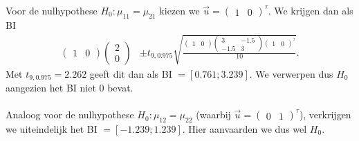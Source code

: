 \documentclass[a4paper,dutch,11pt,]{scrartcl}
\begin{document}
Voor de nulhypothese $H_0:\mu_{11}=\mu_{21}$ kiezen we $\vec{u} = \begin{pmatrix}
                                                            1 & 0
                                                           \end{pmatrix}^\tau$.
We krijgen dan als BI
\begin{align*}
\begin{pmatrix} 1 & 0 \end{pmatrix} \begin{pmatrix} 2 \\ 0 \end{pmatrix}
&\pm t_{9,0.975} \sqrt{ \frac{\begin{pmatrix} 1 & 0 \end{pmatrix} \begin{pmatrix}
                 3 & -1.5\\
		  -1.5 & 3
                \end{pmatrix}  \begin{pmatrix} 1 & 0 \end{pmatrix}^\tau}{10} }.
\end{align*} Met $t_{9,0.975} = 2.262$ geeft dit dan als BI $= [0.761; 3.239]$. We verwerpen dus $H_0$ aangezien het BI niet 0 bevat.

\paragraph{}
Analoog voor de nulhypothese $H_0:\mu_{12}=\mu_{22}$ (waarbij $\vec{u} = \begin{pmatrix}
                                                            0 & 1
                                                           \end{pmatrix}^\tau$), verkrijgen we uiteindelijk het BI $=[-1.239;1.239]$. Hier aanvaarden we dus wel $H_0$.




% 
\end{document}
